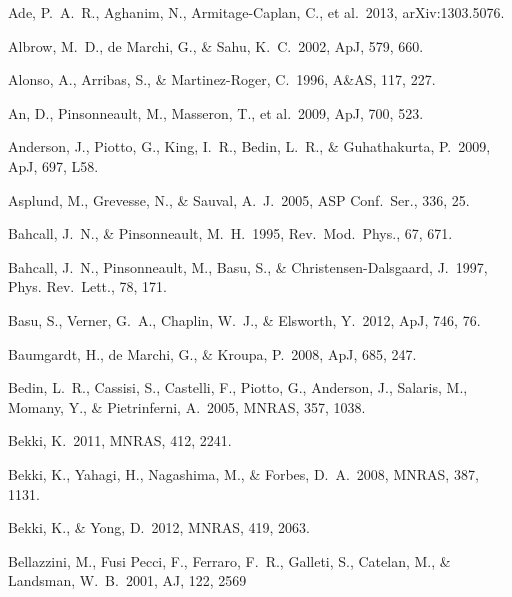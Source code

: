 \documentclass[12pt,preprint]{aastex}
\begin{document}
\newpage
 
\begin{thebibliography}{}

Ade, P.~A.~R., Aghanim, N., Armitage-Caplan, C., et al.~2013, arXiv:1303.5076.

Albrow, M.~D., de Marchi, G., \& Sahu, K.~C.~2002, ApJ, 579, 660.

Alonso, A., Arribas, S., \& Martinez-Roger, C.~1996, A\&AS, 117, 227.

An, D., Pinsonneault, M., Masseron, T., et al.~2009, ApJ, 700, 523.

Anderson, J., Piotto, G., King, I.~R., Bedin, L.~R., \& Guhathakurta, P.~2009,
 ApJ, 697, L58.

Asplund, M., Grevesse, N., \& Sauval, A.~J.~2005, ASP Conf.~Ser., 336, 25.

Bahcall, J.~N., \& Pinsonneault, M.~H.~1995, Rev.~Mod.~Phys., 67, 671.

Bahcall, J.~N., Pinsonneault, M., Basu, S., \& Christensen-Dalsgaard, J.~1997,
 Phys. Rev.~Lett., 78, 171.


Basu, S., Verner, G.~A., Chaplin, W.~J., \& Elsworth, Y.~2012, ApJ, 746, 76.

Baumgardt, H., de Marchi, G., \& Kroupa, P.~2008, ApJ, 685, 247.

Bedin, L.~R., Cassisi, S., Castelli, F., Piotto, G., Anderson, J., Salaris, M.,
 Momany, Y., \& Pietrinferni, A.~2005, MNRAS, 357, 1038.

Bekki, K.~2011, MNRAS, 412, 2241.

Bekki, K., Yahagi, H., Nagashima, M., \& Forbes, D.~A.~2008, MNRAS, 387, 1131.

Bekki, K., \& Yong, D.~2012, MNRAS, 419, 2063.

Bellazzini, M., Fusi Pecci, F., Ferraro, F.~R., Galleti, S., Catelan, M.,
\& Landsman, W.~B.~2001, AJ, 122, 2569


\end{thebibliography}
\end{document}
